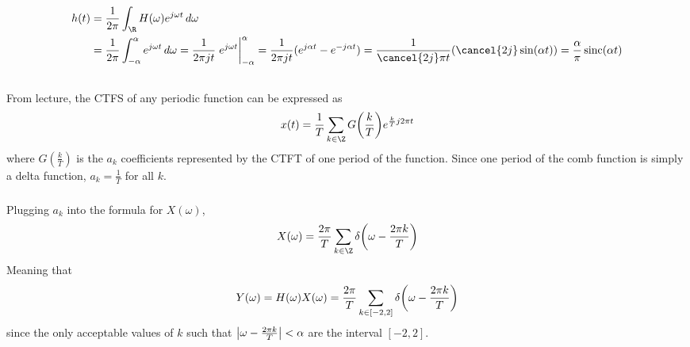 \documentclass{article}
\begin{document}
\subsection{}

\begin{align}
    h(t) &= \frac{1}{2 \pi} \int_{\R} H(\omega) e^{j \omega t} \, d\omega \\
    &= \frac{1}{2 \pi} \int_{-\alpha}^\alpha e^{j \omega t} \, d\omega = \frac{1}{2 \pi j t} \eval{e^{j \omega t}}_{-\alpha}^\alpha = \frac{1}{2 \pi jt} (e^{j \alpha t} - e^{-j \alpha t}) = \frac{1}{\cancel{2j} \pi t} (\cancel{2j} \sin(\alpha t)) = \frac{\alpha}{\pi} \operatorname{sinc}(\alpha t)
\end{align}

\subsection{}

\subsubsection{}

From lecture, the CTFS of any periodic function can be expressed as
\begin{equation}
    x(t) = \frac{1}{T} \sum_{k \in \Z} G\qty(\frac{k}{T}) e^{\frac{k}{T} j 2 \pi t}
\end{equation}
where \(G(\frac{k}{T})\) is the \(a_k\) coefficients represented by the CTFT of one period of the function.
Since one period of the comb function is simply a delta function, \(a_k = \frac{1}{T}\) for all \(k\).

\subsubsection{}

Plugging \(a_k\) into the formula for \(X(\omega)\),
\begin{equation}
    X(\omega) = \frac{2\pi}{T} \sum_{k \in \Z} \delta\qty(\omega - \frac{2\pi k}{T})
\end{equation}
Meaning that
\begin{equation}
    Y(\omega) = H(\omega) X(\omega) = \frac{2\pi}{T} \sum_{k \in [-2, 2]} \delta\qty(\omega - \frac{2\pi k}{T})
\end{equation}
since the only acceptable values of \(k\) such that \(\qty|\omega - \frac{2\pi k}{T}| < \alpha\) are the interval \([-2, 2]\).

\subsubsection{}
\end{document}
